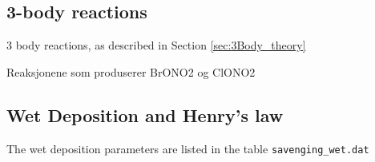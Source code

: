 \subsection{3-body reactions}\label{sec:3bReactions_ctm3}

3 body reactions, as described in Section \ref{sec:3Body_theory}

Reaksjonene som produserer BrONO2 og ClONO2



\subsection{Wet Deposition and Henry's law}\label{sec:henrys_law_ctm3}

The wet deposition parameters are listed in the table \texttt{savenging\_wet.dat} 




